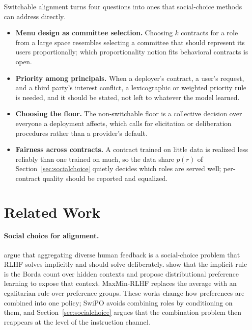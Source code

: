 \documentclass[letterpaper]{article} %
\begin{document}
Switchable alignment turns four questions into ones that social-choice methods can address directly.
\begin{itemize}
    \item \textbf{Menu design as committee selection.} Choosing $k$ contracts for a role from a large space resembles selecting a committee that should represent its users proportionally; which proportionality notion fits behavioral contracts is open.
    \item \textbf{Priority among principals.} When a deployer's contract, a user's request, and a third party's interest conflict, a lexicographic or weighted priority rule is needed, and it should be stated, not left to whatever the model learned.
    \item \textbf{Choosing the floor.} The non-switchable floor is a collective decision over everyone a deployment affects, which calls for elicitation or deliberation procedures rather than a provider's default.
    \item \textbf{Fairness across contracts.} A contract trained on little data is realized less reliably than one trained on much, so the data share $p(r)$ of Section~\ref{sec:socialchoice} quietly decides which roles are served well; per-contract quality should be reported and equalized.
\end{itemize}

\section{Related Work}
\label{sec:related}

\paragraph{Social choice for alignment.}
\citet{conitzer2024social} argue that aggregating diverse human feedback is a social-choice problem that RLHF solves implicitly and should solve deliberately. \citet{siththaranjan2024distributional} show that the implicit rule is the Borda count over hidden contexts and propose distributional preference learning to expose that context. MaxMin-RLHF \cite{chakraborty2024maxmin} replaces the average with an egalitarian rule over preference groups. These works change how preferences are combined into one policy; SwiPO avoids combining roles by conditioning on them, and Section~\ref{sec:socialchoice} argues that the combination problem then reappears at the level of the instruction channel.
\end{document}
